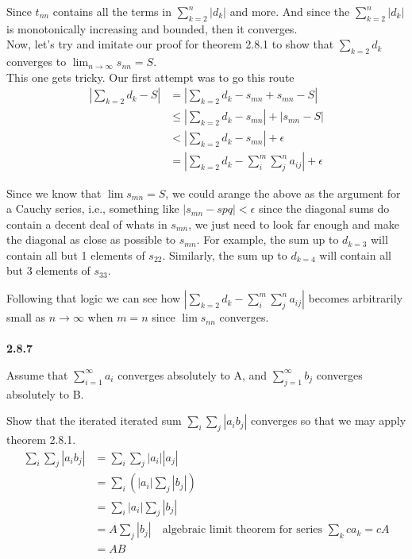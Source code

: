 Since $t_{nn}$ contains all the terms in $\sum^{n}_{k=2} |d_k|$ and more.
And since the $\sum^{n}_{k=2} |d_k|$ is monotonically increasing and bounded, then it converges.
\\

Now, let's try and imitate our proof for theorem 2.8.1 to show that $\sum_{k=2} d_k$
converges to $\lim_{n\rightarrow\infty} s_{nn} = S$.
\\

This one gets tricky.
Our first attempt was to go this route
\begin{align*}
|\sum_{k=2} d_k - S| &= |\sum_{k=2} d_k - s_{mn} + s_{mn} - S| \\
&\leq |\sum_{k=2} d_k - s_{mn}| + |s_{mn} - S| \\
&< |\sum_{k=2} d_k - s_{mn}| + \epsilon \\
&= |\sum_{k=2} d_k - \sum^{m}_{i} \sum^{n}_{j} a_{ij} | + \epsilon
\end{align*}

Since we know that $\lim s_{mn} = S$, we could arange the above as the argument for a
Cauchy series, i.e., something like $|s_{mn} - s{pq}| < \epsilon$ since the diagonal sums
do contain a decent deal of whats in $s_{mn}$, we just need to look far enough and make
the diagonal as close as possible to $s_{mn}$.
For example, the sum up to $d_{k=3}$ will contain all but 1 elements of $s_{22}$.
Similarly, the sum up to $d_{k=4}$ will contain all but 3 elements of $s_{33}$.

Following that logic we can see how $|\sum_{k=2} d_k - \sum^{m}_{i} \sum^{n}_{j} a_{ij} | $
becomes arbitrarily small as $n\rightarrow\infty$ when $m=n$ since $\lim s_{nn}$ converges.
\\~\\



\textbf{2.8.7}

Assume that $\sum^{\infty}_{i=1} a_i$ converges absolutely to A, and $\sum^{\infty}_{j=1} b_j$
converges absolutely to B.

Show that the iterated iterated sum $\sum_i \sum_j |a_i b_j|$ converges so that we may apply
theorem 2.8.1.
\\

\begin{align*}
\sum_i \sum_j |a_i b_j| &= \sum_i \sum_j |a_i| |a_j| \\
&= \sum_i \left( |a_i| \sum_j |b_j| \right) \\
&= \sum_i |a_i| \sum_j |b_j| \\
&= A \sum_j |b_j| \quad \text{algebraic limit theorem for series } \sum_k ca_k = cA \\
&= AB
\end{align*}
\\~\\

